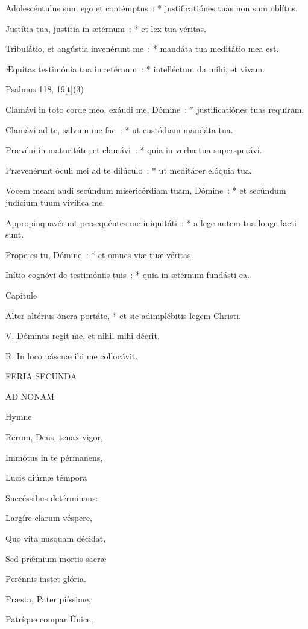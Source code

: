 Adolescéntulus sum ego et contémptus : * justificatiónes tuas non sum oblítus.

Justítia tua, justítia in ætérnum : * et lex tua véritas.

Tribulátio, et angústia invenérunt me : * mandáta tua meditátio mea est.

Æquitas testimónia tua in ætérnum : * intelléctum da mihi, et vivam.



Psalmus 118, 19[t](3)

Clamávi in toto corde meo, exáudi me, Dómine : * justificatiónes tuas requíram.

Clamávi ad te, salvum me fac : * ut custódiam mandáta tua.

Prævéni in maturitáte, et clamávi : * quia in verba tua supersperávi.

Prævenérunt óculi mei ad te dilúculo : * ut meditárer elóquia tua.

Vocem meam audi secúndum misericórdiam tuam, Dómine : * et secúndum judícium tuum vivífica me.

Appropinquavérunt persequéntes me iniquitáti : * a lege autem tua longe facti sunt.

Prope es tu, Dómine : * et omnes viæ tuæ véritas.

Inítio cognóvi de testimóniis tuis : * quia in ætérnum fundásti ea.


Capitule

Alter altérius ónera portáte, * et sic adimplébitis legem Christi.


V. Dóminus regit me, et nihil mihi déerit.

R. In loco páscuæ ibi me collocávit.



FERIA SECUNDA

AD NONAM 


Hymne

Rerum, Deus, tenax vigor,

Immótus in te pérmanens,

Lucis diúrnæ témpora

Succéssibus detérminans:


Largíre clarum véspere,

Quo vita nusquam décidat,

Sed prǽmium mortis sacræ

Perénnis instet glória.


Præsta, Pater piíssime,

Patríque compar Únice,

